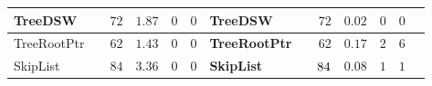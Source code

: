 \documentclass{beamer}
\newcommand{\hcol}[1]{yellow!20!orange!20}
\newcommand{\ucol}[1]{red!50}
\newcommand{\scol}[1]{blue!40}
\begin{document}
\begin{frame}
\begin{center}
\begin{adjustbox}{max height=\textheight, max width=\textwidth}
\begin{tabular}{| l | l | r | r | r | r || l | l | r | r | r | r | r |}
        \hline
		TreeDSW   & \cellcolor{\scol{}} \safe & $72$ & $1.87$  & $0$  & $0$ & \cellcolor{\hcol{}}\textbf{TreeDSW} & \cellcolor{\ucol{}}\unsafe & \cellcolor{\hcol{}} $72$ & \cellcolor{\hcol{}} $0.02$  & \cellcolor{\hcol{}} $0$ &  \cellcolor{\hcol{}} $0$ \\
		\hline
		TreeRootPtr & \cellcolor{\scol{}} \safe & $62$ &  $1.43$  & $0$  &  $0$ & \cellcolor{\hcol{}}\textbf{TreeRootPtr} & \cellcolor{\ucol{}}\unsafe & \cellcolor{\hcol{}} $62$ & \cellcolor{\hcol{}} $0.17$  & \cellcolor{\hcol{}} $2$ & \cellcolor{\hcol{}} $6$\\
        \hline
		SkipList    & \cellcolor{\scol{}} \safe & $84$ & $3.36$  & $0$  & $0$ & \cellcolor{\hcol{}}\textbf{SkipList} & \cellcolor{\ucol{}}\unsafe & $\cellcolor{\hcol{}} 84$ & \cellcolor{\hcol{}} $0.08$  & \cellcolor{\hcol{}} $1$  & \cellcolor{\hcol{}} $1$ \\
        \hline
	\end{tabular}
	\label{tab:times}
	\end{adjustbox}	
	\end{center}

\end{frame}
\end{document}
